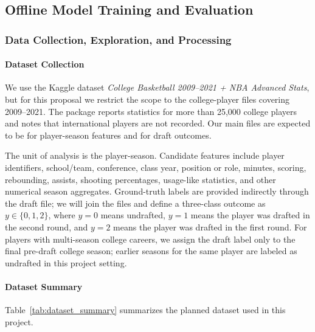 \subsection{Offline Model Training and Evaluation}

\subsubsection{Data Collection, Exploration, and Processing}

\paragraph{Dataset Collection}
We use the Kaggle dataset \textit{College Basketball 2009--2021 + NBA Advanced Stats}, but for this proposal we restrict the scope to the college-player files covering 2009--2021. The package reports statistics for more than 25,000 college players and notes that international players are not recorded. Our main files are expected to be  for player-season features and  for draft outcomes.

The unit of analysis is the player-season. Candidate features include player identifiers, school/team, conference, class year, position or role, minutes, scoring, rebounding, assists, shooting percentages, usage-like statistics, and other numerical season aggregates. Ground-truth labels are provided indirectly through the draft file; we will join the files and define a three-class outcome as $y \in \{0,1,2\}$, where $y = 0$ means undrafted, $y = 1$ means the player was drafted in the second round, and $y = 2$ means the player was drafted in the first round. For players with multi-season college careers, we assign the draft label only to the final pre-draft college season; earlier seasons for the same player are labeled as undrafted in this project setting.

\paragraph{Dataset Summary}
Table~\ref{tab:dataset_summary} summarizes the planned dataset used in this project.

